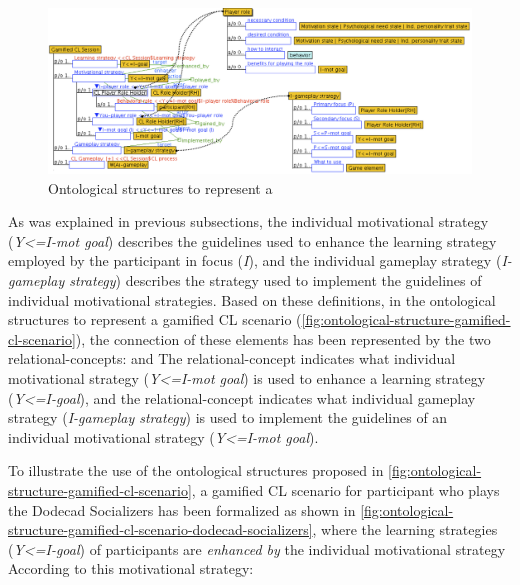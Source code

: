 \begin{figure}[!htbp]
 \caption[Ontological structures to represent a gamified CL scenario]{Ontological structures to represent a }
 \label{fig:ontological-structure-gamified-cl-scenario}
 \centering
 \includegraphics[width=1\textwidth]{images/chap-ontogacles1/ontological-structure-gamified-cl-scenario.png} 
 \fautor
\end{figure}

As was explained in previous subsections, the individual motivational strategy (\emph{Y<=I-mot goal}) describes the guidelines used to enhance the learning strategy employed by the participant in focus (\emph{I}), and the individual gameplay strategy (\emph{I-gameplay strategy}) describes the strategy used to implement the guidelines of individual motivational strategies. Based on these definitions, in the ontological structures to represent a gamified CL scenario (\autoref{fig:ontological-structure-gamified-cl-scenario}), the connection of these elements has been represented by the two relational-concepts:  and  The relational-concept  indicates what individual motivational strategy (\emph{Y<=I-mot goal}) is used to enhance a learning strategy (\emph{Y<=I-goal}), and the relational-concept  indicates what individual gameplay strategy (\emph{I-gameplay strategy}) is used to implement the guidelines of an individual motivational strategy (\emph{Y<=I-mot goal}).

To illustrate the use of the ontological structures proposed in \autoref{fig:ontological-structure-gamified-cl-scenario}, a gamified CL scenario for participant who plays the Dodecad Socializers has been formalized as shown in \autoref{fig:ontological-structure-gamified-cl-scenario-dodecad-socializers}, where the learning strategies (\emph{Y<=I-goal}) of participants are \emph{enhanced by} the individual motivational strategy  According to this motivational strategy:

